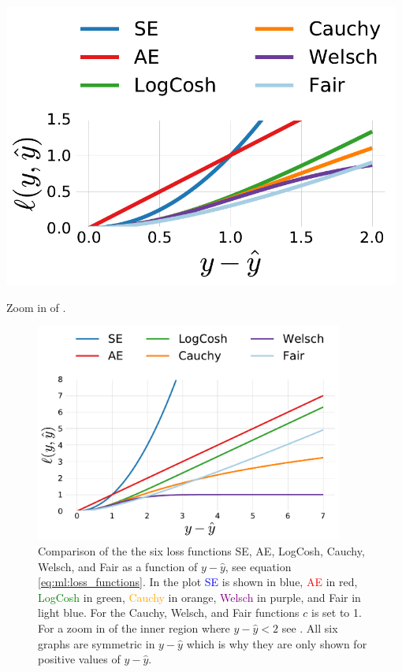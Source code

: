\begin{marginfigure}[-5cm]
  \includegraphics[width=0.98\textwidth]{figures/objective_functions/objective_functions_zoom.pdf}
  \caption[Objective Functions Zoom In]
    {Zoom in of . 
    }
  \label{fig:ml:objective_funcs_zoom}
\end{marginfigure}

\begin{figure}
  \includegraphics[width=0.9\textwidth]{figures/objective_functions/objective_functions.pdf}
  \caption[Objective Functions]
    {Comparison of the the six loss functions SE, AE, LogCosh, Cauchy, Welsch, and Fair as a function of $y-\hat{y}$, see equation \eqref{eq:ml:loss_functions}. In the plot \textcolor{blue}{SE} is shown in blue, \textcolor{red}{AE} in red, \textcolor{green}{LogCosh} in green, \textcolor{orange}{Cauchy} in orange, \textcolor{purple}{Welsch} in purple, and \textcolor{light-blue}{Fair} in light blue. For the Cauchy, Welsch, and Fair functions $c$ is set to 1. For a zoom in of the inner region 
    where $y-\hat{y}<2$ see . All six graphs are symmetric in $y-\hat{y}$ which is why they are only shown for positive values of $y-\hat{y}$.
    }
  \label{fig:ml:objective_funcs}
\end{figure}


